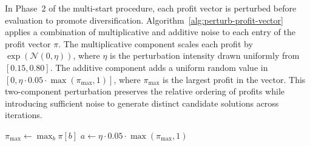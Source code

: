 
In Phase~2 of the multi-start procedure, each profit vector is perturbed before evaluation
to promote diversification. Algorithm~\ref{alg:perturb-profit-vector} applies a combination
of multiplicative and additive noise to each entry of the profit vector $\pi$. The
multiplicative component scales each profit by $\exp(\mathcal{N}(0, \eta))$, where $\eta$
is the perturbation intensity drawn uniformly from $[0.15, 0.80]$. The additive component
adds a uniform random value in $[0, \eta \cdot 0.05 \cdot \max(\pi_{\max}, 1)]$, where
$\pi_{\max}$ is the largest profit in the vector. This two-component perturbation preserves
the relative ordering of profits while introducing sufficient noise to generate distinct
candidate solutions across iterations.

\begin{algorithm}[h!]
	\caption{Perturb Profit Vector} \label{alg:perturb-profit-vector}
	\SetAlgoLined


	$\pi_{\max} \leftarrow \max_{b} \pi[b]$\;
	$a \leftarrow \eta \cdot 0.05 \cdot \max(\pi_{\max}, 1)$\;


	\Return{$\pi$}\;
\end{algorithm}


